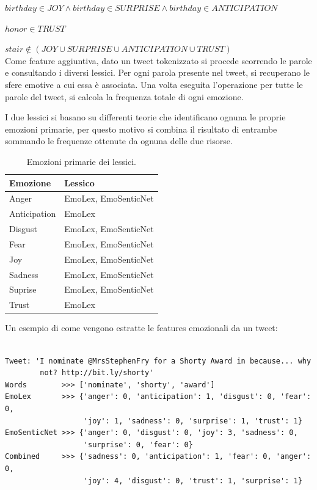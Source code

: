 \documentclass[oneside]{book}
\begin{document}
$birthday \in JOY \land birthday \in SURPRISE \land birthday \in ANTICIPATION$

$honor \in TRUST$

$ stair \notin (JOY \cup SURPRISE \cup ANTICIPATION \cup TRUST) $\\

Come feature aggiuntiva, dato un tweet tokenizzato si procede scorrendo le parole e consultando i diversi lessici. Per ogni parola presente nel tweet, si recuperano le sfere emotive a cui essa è associata. Una volta eseguita l'operazione per tutte le parole del tweet, si calcola la frequenza totale di ogni emozione.

I due lessici si basano su differenti teorie che identificano ognuna le proprie emozioni primarie, per questo motivo si combina il risultato di entrambe sommando le frequenze ottenute da ognuna delle due risorse.

\begin{table}[h!]
	\centering
	\begin{tabular}[t]{l|l}
		\hline
		\textbf{Emozione} & \textbf{Lessico} \\
		\hline
		Anger			& EmoLex, EmoSenticNet \\
		Anticipation	& EmoLex \\
		Disgust			& EmoLex, EmoSenticNet \\
		Fear			& EmoLex, EmoSenticNet \\
		Joy				& EmoLex, EmoSenticNet \\
		Sadness			& EmoLex, EmoSenticNet \\
		Suprise			& EmoLex, EmoSenticNet \\
		Trust			& EmoLex \\
		\hline
	\end{tabular}
	\caption{Emozioni primarie dei lessici.}
\end{table}

\noindent
Un esempio di come vengono estratte le features emozionali da un tweet:

\begin{lstlisting}[caption={Esempio di estrazione delle emozioni da un tweet.}]

Tweet: 'I nominate @MrsStephenFry for a Shorty Award in because... why
        not? http://bit.ly/shorty'
Words	     >>> ['nominate', 'shorty', 'award']
EmoLex       >>> {'anger': 0, 'anticipation': 1, 'disgust': 0, 'fear': 0,
                  'joy': 1, 'sadness': 0, 'surprise': 1, 'trust': 1}
EmoSenticNet >>> {'anger': 0, 'disgust': 0, 'joy': 3, 'sadness': 0,
                  'surprise': 0, 'fear': 0}
Combined     >>> {'sadness': 0, 'anticipation': 1, 'fear': 0, 'anger': 0,
                  'joy': 4, 'disgust': 0, 'trust': 1, 'surprise': 1}
\end{lstlisting}
\end{document}
